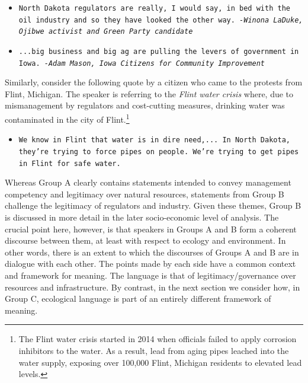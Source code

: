 \begin{footnotesize}
\begin{itemize}
\item[] \texttt{North Dakota regulators are really, I would say, in bed with the oil industry and so they have looked the other way.\newline
\textit{-Winona LaDuke, Ojibwe activist and Green Party candidate}}
\newline
\item[] \texttt{...big business and big ag are pulling the levers of government in Iowa.
\newline
\textit{-Adam Mason, Iowa Citizens for Community Improvement}}
\end{itemize}
\end{footnotesize}

Similarly, consider the following quote by a citizen who came to the protests from Flint, Michigan. The speaker is referring to the \textit{Flint water crisis} where, due to mismanagement by regulators and cost-cutting measures, drinking water was contaminated in the city of Flint.\footnote{The Flint water crisis started in 2014 when officials failed to apply corrosion inhibitors to the water. As a result, lead from aging pipes leached into the water supply, exposing over 100,000 Flint, Michigan residents to elevated lead levels.} 

\begin{footnotesize}
\begin{itemize}
\item[] \texttt{We know in Flint that water is in dire need,... In North Dakota, they're trying to force pipes on people. We're trying to get pipes in Flint for safe water.}
\end{itemize}
\end{footnotesize}

Whereas Group A clearly contains statements intended to convey management competency and legitimacy over natural resources, statements from Group B challenge the legitimacy of regulators and industry. Given these themes, Group B is discussed in more detail in the later socio-economic level of analysis. The crucial point here, however, is that speakers in Groups A and B form a coherent discourse between them, at least with respect to ecology and environment. In other words, there is an extent to which the discourses of Groups A and B are in dialogue with each other. The points made by each side have a common context and framework for meaning. The language is that of legitimacy/governance over resources and infrastructure. By contrast, in the next section we consider how, in Group C, ecological language is part of an entirely different framework of meaning.  

